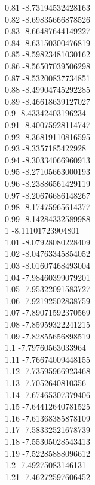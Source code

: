 {0.81	-8.73194532428163\\
0.82	-8.69835666878526\\
0.83	-8.66487644149227\\
0.84	-8.63150300476819\\
0.85	-8.59823481030162\\
0.86	-8.56507039506298\\
0.87	-8.53200837734851\\
0.88	-8.49904745292285\\
0.89	-8.46618639127027\\
0.9	-8.43342403196234\\
0.91	-8.40075928114747\\
0.92	-8.36819110816595\\
0.93	-8.3357185422928\\
0.94	-8.30334066960913\\
0.95	-8.27105663000193\\
0.96	-8.23886561429119\\
0.97	-8.20676686148267\\
0.98	-8.17475965614377\\
0.99	-8.14284332589988\\
1	-8.11101723904801\\
1.01	-8.07928080228409\\
1.02	-8.04763345854052\\
1.03	-8.01607468493004\\
1.04	-7.98460399079201\\
1.05	-7.95322091583727\\
1.06	-7.92192502838759\\
1.07	-7.89071592370569\\
1.08	-7.85959322241215\\
1.09	-7.82855656898519\\
1.1	-7.79760563033964\\
1.11	-7.76674009448155\\
1.12	-7.73595966923468\\
1.13	-7.7052640810356\\
1.14	-7.67465307379406\\
1.15	-7.64412640781525\\
1.16	-7.61368385878109\\
1.17	-7.58332521678739\\
1.18	-7.55305028543413\\
1.19	-7.52285888096612\\
1.2	-7.49275083146131\\
1.21	-7.46272597606452\\
}
